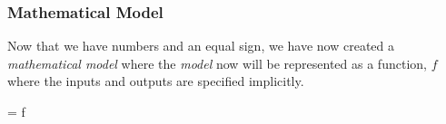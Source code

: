 \documentclass[slides]{beamer} %
\begin{document}
\begin{frame}\frametitle{Mathematical Model}

Now that we have numbers and an equal sign, we have now created a \textit{mathematical model} where the \textit{model} now will be represented as a function, $f$ where the inputs and outputs are specified implicitly.

 \beqn
{} = f
\eeqn

	
\end{frame}


\begin{frame}\frametitle{}

	
\end{frame}


\begin{frame}\frametitle{}

	
\end{frame}


\begin{frame}\frametitle{}

	
\end{frame}
\end{document}

